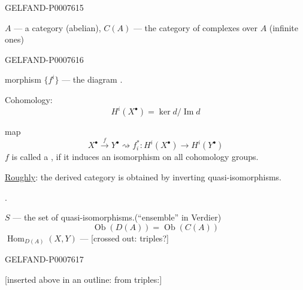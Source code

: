 \begin{GelfandAdjacentEvidence}{GELFAND-P000761}{5}


\(A\) --- a category (abelian),
\(C(A)\) --- the category of complexes over \(A\) (infinite ones)

\end{GelfandAdjacentEvidence}
\begin{GelfandAdjacentEvidence}{GELFAND-P000761}{6}

morphism \(\{f^i\}\) --- the diagram .

Cohomology:
\[
H^i(X^\bullet)=\ker d/\operatorname{Im}d
\]

map
\[
X^\bullet\xrightarrow{f}Y^\bullet
\rightsquigarrow f_i^*:H^i(X^\bullet)\longrightarrow H^i(Y^\bullet)
\]
\(f\) is called a , if it induces an isomorphism on all cohomology groups.

\underline{Roughly}: the derived category is obtained by inverting quasi-isomorphisms.

.

\(S\) --- the set of quasi-isomorphisms.\qquad (“ensemble” in Verdier)
\[
\operatorname{Ob}(D(A))=\operatorname{Ob}(C(A))
\]
\(\operatorname{Hom}_{D(A)}(X,Y)\) ---
[crossed out: triples?]
\end{GelfandAdjacentEvidence}
\begin{GelfandAdjacentEvidence}{GELFAND-P000761}{7}

[inserted above in an outline: from triples:]
\end{GelfandAdjacentEvidence}




